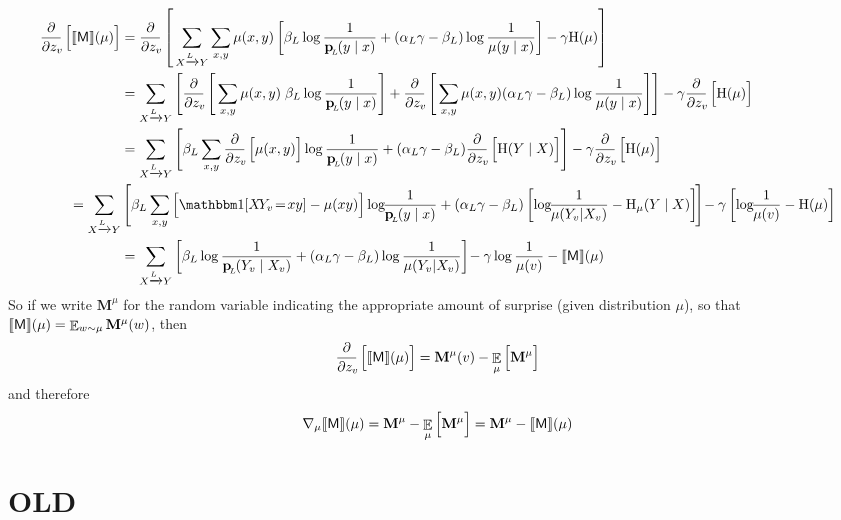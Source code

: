 \documentclass{article}
\newcommand{\bp}[1][L]{\mat{p}_{\!_#1\!}}
\newcommand{\sfM}{\mathsf M}
\begin{document}
	\begin{align*}
		\pz{\bbr{\sfM}(\mu)} &= \pz{ \sum_{ X \xrightarrow{\!\!L} Y} \sum_{x,y}\mu(x,y)  \left[
		\beta_L \log \frac{1}{\bp(y\mid x)} + (\alpha_L\gamma - \beta_L) \log \frac{1}{\mu(y \mid x)} \right] - \gamma \H(\mu)} \\
		&= \sum_{ X \xrightarrow{\!\!L} Y} \left[ \pz{  \sum_{x,y}\mu(x,y)\;
		\beta_L \log \frac{1}{\bp(y\mid x)}} +  \pz{\sum_{x,y}\mu(x,y) (\alpha_L\gamma - \beta_L) \log \frac{1}{\mu(y \mid x)} } \right] - \gamma \pz{\H(\mu)} \\
		&= \sum_{ X \xrightarrow{\!\!L} Y}  \left[   \beta_L\sum_{x,y}\pz{\mu(x,y)}  \log \frac{1}{\bp(y\mid x)} +  (\alpha_L\gamma - \beta_L) \pz{\H(Y\mid X) } \right] - \gamma \pz{\H(\mu)} \\
		= \sum_{ X \xrightarrow{\!\!L} Y} & \left[  \beta_L\sum_{x,y} \Big[\mathbbm1[X\!Y_v \!=\! xy] - \mu(xy)\Big]  \log \!\!\frac{1}{\bp(y\mid x)} +  (\alpha_L\gamma - \beta_L) \left[ \log\!\! \frac{1}{\mu(Y_v | X_v)} - \H_\mu(Y \mid X)\right] \! \right] \!- \gamma\left[\log\!\!\frac{1}{\mu(v)}- \H(\mu)\right] \\
		 &= \sum_{ X \xrightarrow{\!\!L} Y}\left[  \beta_L \log \frac{1}{\bp(Y_v \mid X_v)} +  (\alpha_L\gamma - \beta_L) \log \frac{1}{\mu(Y_v | X_v)} \right] \!- \gamma\log\frac{1}{\mu(v)} - \bbr{\sfM}(\mu) \\
	\end{align*}
	\def\MM{\mathbf{M}}
	So if we write $\MM^\mu$ for the random variable indicating the appropriate amount of surprise (given distribution $\mu$), so that $\bbr{\sfM}(\mu) = \E_{w \sim \mu} \MM^\mu(w)$, then 
	\[ \pz{\bbr{\sfM}(\mu)} = \MM^\mu(v) - \E_{\mu}\Big[ \MM^\mu \Big] \]
	and therefore
	\[ \nabla_\mu{\bbr{\sfM}(\mu)} = \MM^\mu - \E_{\mu}\Big[ \MM^\mu \Big]
		= \MM^\mu - \bbr{\sf M}(\mu) \]
	
	\clearpage
	\section*{OLD}
	
\end{document}
